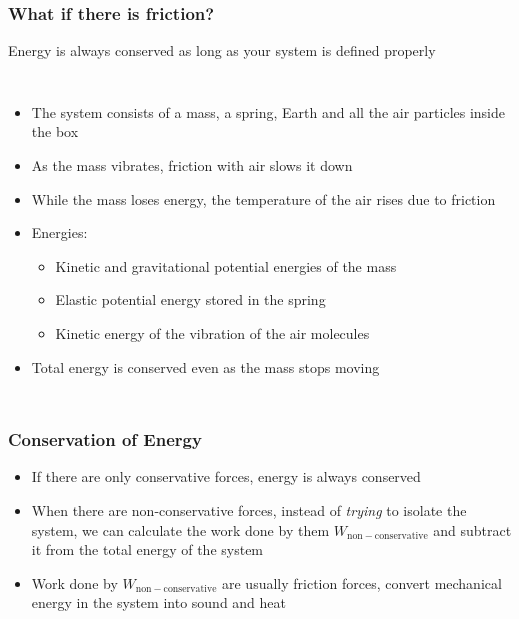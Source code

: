 \documentclass[12pt,compress,aspectratio=169]{beamer}
\newcommand{\eq}[2]{\vspace{#1}{\Large\begin{displaymath}#2\end{displaymath}}}
\begin{document}
\begin{frame}
  \frametitle{What if there is friction?}
  Energy is always conserved as long as your system is defined properly

  \begin{columns}
    \begin{itemize}
    \item The system consists of a mass, a spring, Earth and all the air
      particles inside the box
    \item As the mass vibrates, friction with air slows it down
    \item While the mass loses energy, the temperature of the air rises due to
      friction
    \item Energies:
      \begin{itemize}
      \item Kinetic and gravitational potential energies of the mass
      \item Elastic potential energy stored in the spring
      \item Kinetic energy of the vibration of the air molecules
      \end{itemize}
    \item Total energy is conserved even as the mass stops moving
    \end{itemize}
  \end{columns}
\end{frame}


\begin{frame}
  \frametitle{Conservation of Energy}
  \begin{itemize}
  \item If there are only conservative forces, energy is always conserved
  \item When there are non-conservative forces, instead of \emph{trying} to
    isolate the system, we can calculate the work done by them
    $W_\mathrm{non-conservative}$ and subtract it from the total energy of the
    system
    
    \eq{-.2in}{
      \boxed{K+U+W_\mathrm{non-conservative}=K'+U'}
  }
  \item Work done by $W_\mathrm{non-conservative}$ are usually friction forces,
    convert mechanical energy in the system into sound and heat
  \end{itemize}
\end{frame}
\end{document}
